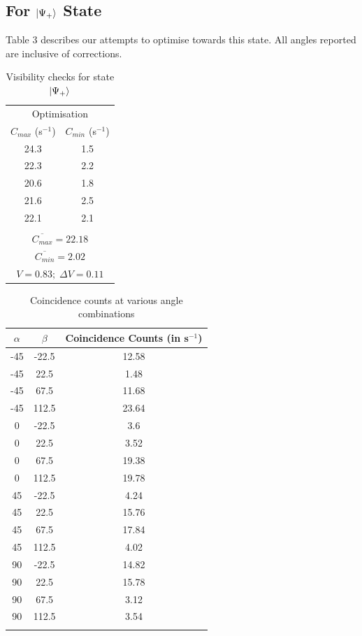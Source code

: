 \documentclass[10pt,a4paper]{article}
\begin{document}
\subsection*{For $\ket{\Psi_{+}}$ State}
Table 3 describes our attempts to optimise towards this state. All angles reported are inclusive of corrections.
\begin{table}[H]
\centering
\begin{tabular}{|c|c|}
\hline
\multicolumn{2}{|c|}{Optimisation}\\
$C_{max}$ (s$^{-1}$) & $C_{min}$ (s$^{-1}$)\\
\hline
24.3 & 1.5 \\
22.3 & 2.2 \\
20.6 & 1.8 \\
21.6 & 2.5 \\
22.1 & 2.1 \\
\hline
\multicolumn{2}{|c|}{}\\[-2mm]
\multicolumn{2}{|c|}{$\overline{C_{max}} = 22.18$}\\
\multicolumn{2}{|c|}{$\overline{C_{min}} = 2.02$}\\
\multicolumn{2}{|c|}{$V = 0.83;\; \Delta V = 0.11$}\\
\hline
\end{tabular}
\caption{Visibility checks for state $\ket{\Psi_{+}}$}
\end{table}
\begin{longtable}{|c|c|c|}
\hline
$\alpha$ & $\beta$ & Coincidence Counts (in s$^{-1}$)\\
\hline
-45 & -22.5 & 12.58\\
-45 & 22.5 & 1.48\\
-45 & 67.5 & 11.68\\
-45 & 112.5 & 23.64\\
\hline
0 & -22.5 & 3.6\\
0 & 22.5 & 3.52\\
0 & 67.5 & 19.38\\
0 & 112.5 & 19.78\\
\hline
45 & -22.5 & 4.24\\
45 & 22.5 & 15.76\\
45 & 67.5 & 17.84\\
45 & 112.5 & 4.02\\
\hline
90 & -22.5 & 14.82\\
90 & 22.5 & 15.78\\
90 & 67.5 & 3.12\\
90 & 112.5 & 3.54\\
\hline
\caption{Coincidence counts at various angle combinations}
\end{longtable}
\end{document}
